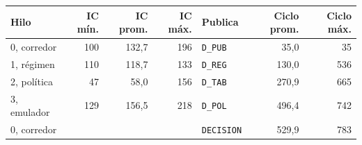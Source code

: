 \begin{tabular}{lrrrlrr}
\toprule
Hilo & IC mín. & IC prom. & IC máx. & Publica & Ciclo prom. & Ciclo máx. \\
\midrule
0, corredor & 100 & 132{,}7 & 196 & \texttt{D\_PUB} & 35{,}0 & 35 \\
1, régimen & 110 & 118{,}7 & 133 & \texttt{D\_REG} & 130{,}0 & 536 \\
2, política & 47 & 58{,}0 & 156 & \texttt{D\_TAB} & 270{,}9 & 665 \\
3, emulador & 129 & 156{,}5 & 218 & \texttt{D\_POL} & 496{,}4 & 742 \\
0, corredor &  &  &  & \texttt{DECISION} & 529{,}9 & 783 \\
\bottomrule
\end{tabular}
\par{}
